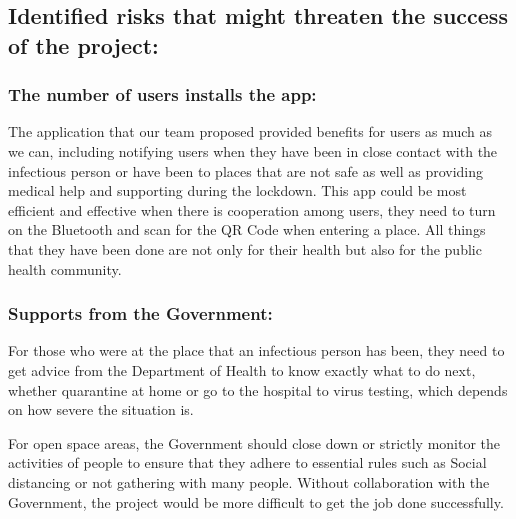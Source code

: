   \subsection{Identified risks that might threaten the success of the project:}
    \subsubsection{The number of users installs the app:}
      \par The application that our team proposed provided benefits for users as much as we can, including notifying users when they have been in close contact with the infectious person or have been to places that are not safe as well as providing medical help and supporting during the lockdown. This app could be most efficient and effective when there is cooperation among users, they need to turn on the Bluetooth and scan for the QR Code when entering a place. All things that they have been done are not only for their health but also for the public health community.
    \subsubsection{Supports from the Government:}
      \par For those who were at the place that an infectious person has been, they need to get advice from the Department of Health to know exactly what to do next, whether quarantine at home or go to the hospital to virus testing, which depends on how severe the situation is.
      \par For open space areas, the Government should close down or strictly monitor the activities of people to ensure that they adhere to essential rules such as Social distancing or not gathering with many people. Without collaboration with the Government, the project would be more difficult to get the job done successfully.

    

